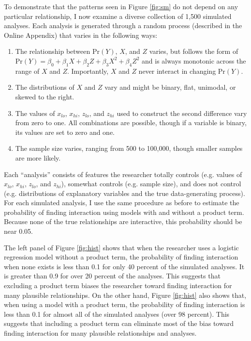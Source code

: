 \documentclass[12pt]{article}
\begin{document}
To demonstrate that the patterns seen in Figure \ref{fig:sm} do not depend on any particular relationship, I now examine a diverse collection of 1,500 simulated analyses. Each analysis is generated through a random process (described in the Online Appendix) that varies in the following ways:\singlespace\vspace{-3mm}
\begin{enumerate}
\item The relationship between $\text{Pr}(Y)$, $X$, and $Z$ varies, but follows the form of $\text{Pr}(Y) = \beta_0 + \beta_1X + \beta_2Z + \beta_3X^2 + \beta_4Z^2$ and is always monotonic across the range of $X$ and $Z$. Importantly, $X$ and $Z$ never interact in changing $\text{Pr}(Y)$.
\item The distributions of $X$ and $Z$ vary and might be binary, flat, unimodal, or  skewed to the right.
\item The values of $x_{lo}$, $x_{hi}$, $z_{lo}$, and $z_{hi}$ used to construct the second difference vary from zero to one. All combinations are possible, though if a variable is binary, its values are set to zero and one.
\item The sample size varies, ranging from 500 to 100,000, though smaller samples are more likely.


\end{enumerate}
\doublespace
Each ``analysis'' consists of features the researcher totally controls (e.g. values of $x_{lo}$, $x_{hi}$, $z_{lo}$, and $z_{hi}$), somewhat controls (e.g. sample size), and does not control (e.g. distributions of explanatory variables and the true data-generating process). For each simulated analysis, I use the same procedure as before to estimate the probability of finding interaction using models with and without a product term. Because none of the true relationships are interactive, this probability should be near 0.05. 

The left panel of Figure \ref{fig:hist} shows that when the researcher uses a logistic regression model without a product term, the probability of finding interaction when none exists is less than 0.1  for  only 40 percent of the simulated analyses. It is greater than 0.9 for over 20 percent of the analyses. This suggests that excluding a product term biases the researcher toward finding interaction for many plausible relationships. On the other hand, Figure  \ref{fig:hist} also shows that, when using a model with a product term, the probability of finding interaction is less than 0.1  for almost all of the simulated analyses  (over 98 percent).
This suggests that including a product term can eliminate most of the bias toward finding interaction for many plausible relationships and analyses.
\end{document}
